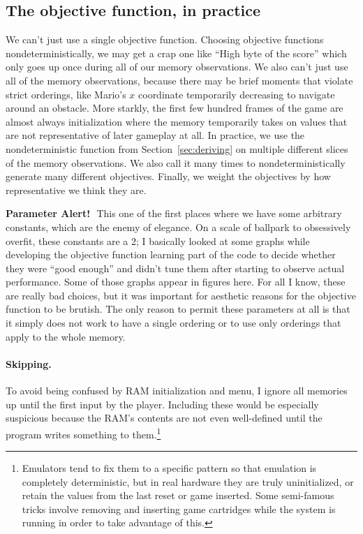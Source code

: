 \documentclass[twocolumn]{article}
\newcommand\parameteralert[1]{
  {\bf Parameter Alert!}\,\, #1
}
\begin{document}
\subsection{The objective function, in practice}

We can't just use a single objective function. Choosing objective
functions nondeterministically, we may get a crap one like ``High byte
of the score'' which only goes up once during all of our memory
observations. We also can't just use all of the memory observations,
because there may be brief moments that violate strict orderings, like
Mario's $x$ coordinate temporarily decreasing to navigate around an
obstacle. More starkly, the first few hundred frames of the game are
almost always initialization where the memory temporarily takes on
values that are not representative of later gameplay at all. In
practice, we use the nondeterministic function from
Section~\ref{sec:deriving} on multiple different slices of the memory
observations. We also call it many times to nondeterministically
generate many different objectives. Finally, we weight the objectives
by how representative we think they are.

\parameteralert{This one of the first places where we have some
  arbitrary constants, which are the enemy of elegance. On a scale of
  ballpark to obsessively overfit, these constants are a 2; I
  basically looked at some graphs while developing the objective
  function learning part of the code to decide whether they were
  ``good enough'' and didn't tune them after starting to observe
  actual performance. Some of those graphs appear in figures here.
  For all I know, these are really bad choices, but it was important
  for aesthetic reasons for the objective function to be brutish. The
  only reason to permit these parameters at all is that it simply
  does not work to have a single ordering or to use only orderings
  that apply to the whole memory.}

\paragraph{Skipping.} To avoid being confused by RAM initialization and
menu, I ignore all memories up until the first input by the player.
Including these would be especially suspicious because the RAM's
contents are not even well-defined until the program writes something
to them.\footnote{Emulators tend to fix them to a specific pattern so
  that emulation is completely deterministic, but in real hardware
  they are truly uninitialized, or retain the values from the last
  reset or game inserted. Some semi-famous tricks involve removing and
  inserting game cartridges while the system is running in order to
  take advantage of this.}
\end{document}
